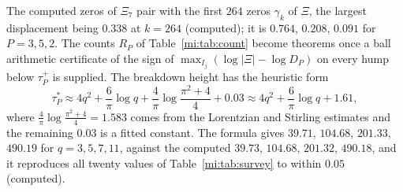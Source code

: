 The computed zeros of $\Xi_7$ pair with the first $264$ zeros $\gamma_k$ of $\Xi$, the largest displacement being $0.338$ at $k=264$ (computed); it is $0.764$, $0.208$, $0.091$ for $P=3,5,2$. The counts $R_P$ of Table~\ref{mi:tab:count} become theorems once a ball arithmetic certificate of the sign of $\max_{I_j}(\log|\Xi|-\log D_P)$ on every hump below $\tau_P^+$ is supplied. The breakdown height has the heuristic form
\[
\tau_P^*\approx4q^2+\frac6\pi\log q+\frac4\pi\log\frac{\pi^2+4}4+0.03\approx4q^2+\frac6\pi\log q+1.61,
\]
where $\frac4\pi\log\frac{\pi^2+4}4=1.583$ comes from the Lorentzian and Stirling estimates and the remaining $0.03$ is a fitted constant. The formula gives $39.71$, $104.68$, $201.33$, $490.19$ for $q=3,5,7,11$, against the computed $39.73$, $104.68$, $201.32$, $490.18$, and it reproduces all twenty values of Table~\ref{mi:tab:survey} to within $0.05$ (computed).
